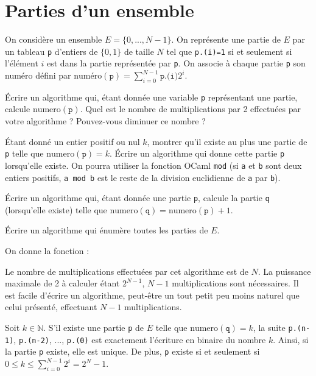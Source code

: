 \renewcommand{\SourceFile}{7-arithmetique-et-calculs-numeriques/src/7-1.ml}

\section{Parties d'un ensemble}

On considère un ensemble $E=\{0,...,N-1\}$. On représente une partie de $E$ par un tableau \texttt{p} d'entiers de $\{0,1\}$ de taille $N$ tel que \texttt{p.(i)=1} si et seulement si l'élément $i$ est dans la partie représentée par \texttt{p}. On associe à chaque partie \texttt{p} son numéro défini par $\textrm{numéro}(\texttt{p})=\sum_{i=0}^{N-1}\texttt{p.(i)}2^i$.

\Q
Écrire un algorithme qui, étant donnée une variable \texttt{p} représentant une partie, calcule $\textrm{numero}(\texttt{p})$. Quel est le nombre de multiplications par 2 effectuées par votre algorithme ? Pouvez-vous diminuer ce nombre ?

\Q
Étant donné un entier positif ou nul $k$, montrer qu'il existe au plus une partie de \texttt{p} telle que $\textrm{numero}(\texttt{p})=k$. Écrire un algorithme qui donne cette partie \texttt{p} lorsqu'elle existe. On pourra utiliser la fonction OCaml \texttt{mod} (si \texttt{a} et \texttt{b} sont deux entiers positifs, \texttt{a mod b} est le reste de la division euclidienne de \texttt{a} par \texttt{b}).

\Q
Écrire un algorithme qui, étant donnée une partie \texttt{p}, calcule la partie \texttt{q} (lorsqu'elle existe) telle que $\textrm{numero}(\texttt{q})=\textrm{numero}(\texttt{p})+1$.

\Q
Écrire un algorithme qui énumère toutes les parties de $E$.

\Corrige

\Q
On donne la fonction :



Le nombre de multiplications effectuées par cet algorithme est de $N$. La puissance maximale de 2 à calculer étant $2^{N-1}$, $N-1$ multiplications sont nécessaires. Il est facile d'écrire un algorithme, peut-être un tout petit peu moins naturel que celui présenté, effectuant $N-1$ multiplications.

\Q
Soit $k \in \mathbb{N}$. S'il existe une partie \texttt{p} de $E$ telle que $\textrm{numero}(\texttt{q})=k$, la suite \texttt{p.(n-1)}, \texttt{p.(n-2)}, ..., \texttt{p.(0)} est exactement l'écriture en binaire du nombre $k$. Ainsi, si la partie \texttt{p} existe, elle est unique. De plus, \texttt{p} existe si et seulement si $0 \leq k \leq \sum_{i=0}^{N-1}2^i=2^{N}-1$.
\medskip

